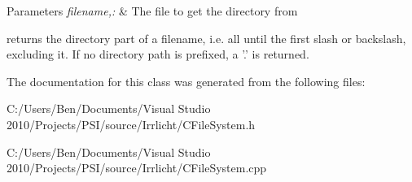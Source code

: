 \begin{DoxyParams}{Parameters}
{\em filename,\-:} & The file to get the directory from\\
\hline
\end{DoxyParams}
returns the directory part of a filename, i.\-e. all until the first slash or backslash, excluding it. If no directory path is prefixed, a '.' is returned. 

The documentation for this class was generated from the following files\-:\begin{DoxyCompactItemize}
\item 
C\-:/\-Users/\-Ben/\-Documents/\-Visual Studio 2010/\-Projects/\-P\-S\-I/source/\-Irrlicht/C\-File\-System.\-h\item 
C\-:/\-Users/\-Ben/\-Documents/\-Visual Studio 2010/\-Projects/\-P\-S\-I/source/\-Irrlicht/C\-File\-System.\-cpp\end{DoxyCompactItemize}
